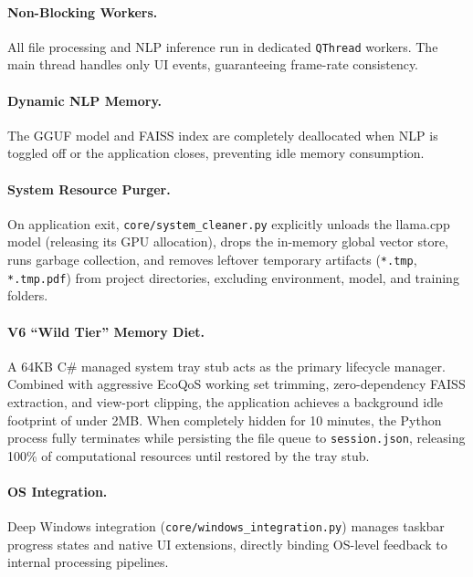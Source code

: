 \documentclass[11pt]{article}
\begin{document}
\paragraph{Non-Blocking Workers.}
All file processing and NLP inference run in dedicated \texttt{QThread}
workers. The main thread handles only UI events, guaranteeing frame-rate
consistency.

\paragraph{Dynamic NLP Memory.}
The GGUF model and FAISS index are completely deallocated when NLP is toggled
off or the application closes, preventing idle memory consumption.

\paragraph{System Resource Purger.}
On application exit, \texttt{core/system\_cleaner.py} explicitly unloads the llama.cpp model (releasing its GPU allocation), drops the in-memory global vector store, runs garbage collection, and removes leftover temporary artifacts (\texttt{*.tmp}, \texttt{*.tmp.pdf}) from project directories, excluding environment, model, and training folders.

\paragraph{V6 ``Wild Tier'' Memory Diet.}
A 64KB C\# managed system tray stub acts as the primary lifecycle manager. Combined with aggressive EcoQoS working set trimming, zero-dependency FAISS extraction, and view-port clipping, the application achieves a background idle footprint of under 2MB. When completely hidden for 10 minutes, the Python process fully terminates while persisting the file queue to \texttt{session.json}, releasing 100\% of computational resources until restored by the tray stub.

\paragraph{OS Integration.}
Deep Windows integration (\texttt{core/windows\_integration.py}) manages taskbar progress states and native UI extensions, directly binding OS-level feedback to internal processing pipelines.
\end{document}
